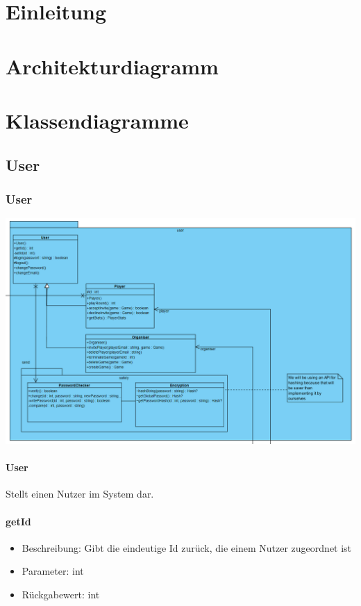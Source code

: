 \documentclass[a4paper]{scrreprt}
\begin{document}
    \tableofcontents
    \chapter{Einleitung}
    \chapter{Architekturdiagramm}

    \chapter{Klassendiagramme}

    \section{User}
    \subsection{User}
    \includegraphics[width=\textwidth]{img/user.png}
    \subsubsection{User}
    Stellt einen Nutzer im System dar.
    \subsubsection{getId}
    \begin{itemize}
        \item Beschreibung: Gibt die eindeutige Id zurück, die einem Nutzer zugeordnet ist
        \item Parameter: int
        \item Rückgabewert: int
    \end{itemize}
\end{document}

